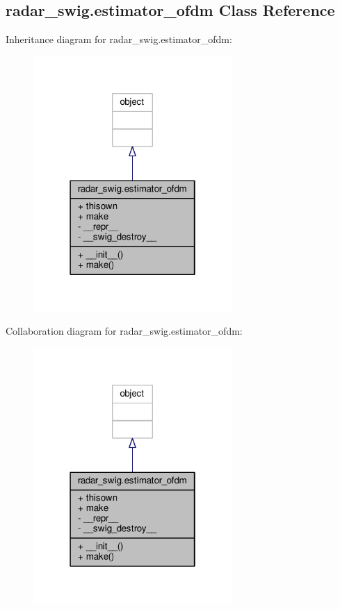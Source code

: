 \subsection{radar\+\_\+swig.\+estimator\+\_\+ofdm Class Reference}
\label{classradar__swig_1_1estimator__ofdm}


Inheritance diagram for radar\+\_\+swig.\+estimator\+\_\+ofdm\+:
\nopagebreak
\begin{figure}[H]
\begin{center}
\leavevmode
\includegraphics[width=214pt]{dd/d7a/classradar__swig_1_1estimator__ofdm__inherit__graph}
\end{center}
\end{figure}


Collaboration diagram for radar\+\_\+swig.\+estimator\+\_\+ofdm\+:
\nopagebreak
\begin{figure}[H]
\begin{center}
\leavevmode
\includegraphics[width=214pt]{dd/d1d/classradar__swig_1_1estimator__ofdm__coll__graph}
\end{center}
\end{figure}
